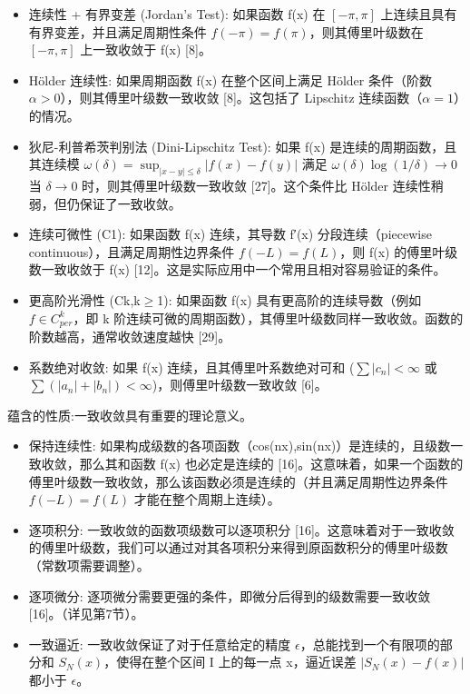 \begin{itemize}
	\item 连续性 + 有界变差 (Jordan's Test): 如果函数 f(x) 在 $[-\pi,\pi]$ 上连续且具有有界变差，并且满足周期性条件 $f(-\pi)=f(\pi)$，则其傅里叶级数在 $[-\pi,\pi]$ 上一致收敛于 f(x) [8]。
	\item Hölder 连续性: 如果周期函数 f(x) 在整个区间上满足 Hölder 条件（阶数 $\alpha>0$），则其傅里叶级数一致收敛 [8]。这包括了 Lipschitz 连续函数（$\alpha=1$）的情况。
	\item 狄尼-利普希茨判别法 (Dini-Lipschitz Test): 如果 f(x) 是连续的周期函数，且其连续模 $\omega(\delta)=\sup_{|x-y|\leq\delta}|f(x)−f(y)|$ 满足 $\omega(\delta)\log(1/\delta)\to 0$ 当 $\delta\to 0$ 时，则其傅里叶级数一致收敛 [27]。这个条件比 Hölder 连续性稍弱，但仍保证了一致收敛。
	\item 连续可微性 (C1): 如果函数 f(x) 连续，其导数 f′(x) 分段连续（piecewise continuous），且满足周期性边界条件 $f(−L)=f(L)$，则 f(x) 的傅里叶级数一致收敛于 f(x) [12]。这是实际应用中一个常用且相对容易验证的条件。
	\item 更高阶光滑性 (Ck,k$\geq$1): 如果函数 f(x) 具有更高阶的连续导数（例如 $f\in C_{per}^k$，即 k 阶连续可微的周期函数），其傅里叶级数同样一致收敛。函数的阶数越高，通常收敛速度越快 [29]。
	\item 系数绝对收敛: 如果 f(x) 连续，且其傅里叶系数绝对可和 ($\sum|c_n|<\infty$ 或 $\sum(|a_n|+|b_n|)<\infty$)，则傅里叶级数一致收敛 [6]。
\end{itemize}

蕴含的性质:一致收敛具有重要的理论意义。

\begin{itemize}
	\item 保持连续性: 如果构成级数的各项函数（cos(nx),sin(nx)）是连续的，且级数一致收敛，那么其和函数 f(x) 也必定是连续的 [16]。这意味着，如果一个函数的傅里叶级数一致收敛，那么该函数必须是连续的（并且满足周期性边界条件 $f(−L)=f(L)$ 才能在整个周期上连续）。
	\item 逐项积分: 一致收敛的函数项级数可以逐项积分 [16]。这意味着对于一致收敛的傅里叶级数，我们可以通过对其各项积分来得到原函数积分的傅里叶级数（常数项需要调整）。
	\item 逐项微分: 逐项微分需要更强的条件，即微分后得到的级数需要一致收敛 [16]。（详见第7节）。
	\item 一致逼近: 一致收敛保证了对于任意给定的精度 $\epsilon$，总能找到一个有限项的部分和 $S_N(x)$，使得在整个区间 I 上的每一点 x，逼近误差 $|S_N(x)−f(x)|$ 都小于 $\epsilon$。
\end{itemize}

